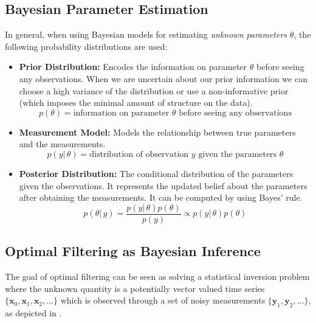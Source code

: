 \subsection{Bayesian Parameter Estimation}
In general, when using Bayesian models for estimating
\textit{unknown parameters} $\theta$, the following probability distributions
are used:

\begin{itemize}
\item \textbf{Prior Distribution:}
Encodes the information on parameter $\theta$ before seeing any
observations. When we are uncertain about our prior information
we can choose a high variance of the distribution or use a
non-informative prior (which imposes the minimal amount of structure
on the data).
$$ p(\theta) = \text{information on parameter } \theta
\text{ before seeing any observations} $$

\item \textbf{Measurement Model:}
Models the relationship between true parameters and the measurements.
$$ p(y |\, \theta) = \text{distribution of observation } y
\text{ given the parameters } \theta $$

\item \textbf{Posterior Distribution:}
The conditional distribution of the parameters given the observations.
It represents the updated belief about the parameters
after obtaining the measurements. It can be computed by using Bayes' rule.
$$ p(\theta |\, y) = \frac{p(y |\, \theta) p(\theta)}{p(y)}
\propto p(y |\, \theta) p(\theta) $$
\end{itemize}

\subsection{Optimal Filtering as Bayesian Inference}
The goal of optimal filtering can be seen as solving a statistical
inversion problem where
the unknown quantity is a potentially vector valued
time series $\{\mathbf{x}_0, \mathbf{x}_1, \mathbf{x}_2,...\}$ which
is observed through a set of noisy measurements
$\{\mathbf{y}_1, \mathbf{y}_2,...\}$, as depicted in .

